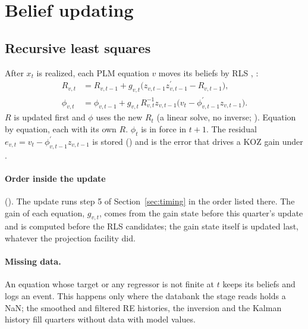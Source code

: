 \documentclass[11pt,a4paper]{article}
\newcommand{\transp}{^{\prime}}
\begin{document}
\section{Belief updating}\label{sec:updating}

\subsection{Recursive least squares}\label{sec:rls}

After $x_t$ is realized, each PLM equation $v$ moves its beliefs by RLS \citep[eq.~13]{ozden2025},
\citep{evans2001}:
\begin{align}
  R_{v,t} &= R_{v,t-1} + g_{v,t}\bigl(z_{v,t-1} z_{v,t-1}\transp - R_{v,t-1}\bigr), \label{eq:rlsR}\\
  \phi_{v,t} &= \phi_{v,t-1} + g_{v,t}\, R_{v,t}^{-1} z_{v,t-1}\bigl(v_t - \phi_{v,t-1}\transp z_{v,t-1}\bigr). \label{eq:rlsphi}
\end{align}
$R$ is updated first and $\phi$ uses the new $R_t$ (a linear solve, no inverse;
). Equation by equation, each with its own $R$. $\phi_t$ is in force in $t+1$.
The residual $e_{v,t} = v_t - \phi_{v,t-1}\transp z_{v,t-1}$ is stored () and is the
error that drives a KOZ gain under .

\paragraph{Order inside the update} (). The update runs step 5
of Section~\ref{sec:timing} in the order listed there. The gain of each equation, $g_{v,t}$, comes
from the gain state before this quarter's update and is computed before the RLS candidates; the
gain state itself is updated last, whatever the projection facility did.

\paragraph{Missing data.} An equation whose target or any regressor is not finite at $t$ keeps
its beliefs and logs an  event. This happens only where the databank the
stage reads holds a NaN; the smoothed and filtered RE histories, the inversion and the Kalman
history fill quarters without data with model values.
\end{document}
